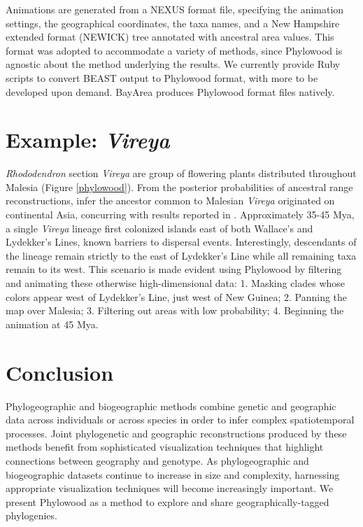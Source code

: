 \documentclass{bioinfo}
\begin{document}
Animations are generated from a NEXUS format file, specifying the animation settings, the geographical coordinates, the taxa names, and a New Hampshire extended format (NEWICK) tree annotated with ancestral area values. This format was adopted to accommodate a variety of methods, since Phylowood is agnostic about the method underlying the results. We currently provide Ruby scripts to convert BEAST output to Phylowood format, with more to be developed upon demand. BayArea produces Phylowood format files natively.

\section{Example: {\it Vireya}}

{\it Rhododendron} section {\it Vireya} are group of flowering plants distributed throughout Malesia (Figure \ref{phylowood}). From the posterior probabilities of ancestral range reconstructions, \cite{landis13} infer the ancestor common to Malesian {\it Vireya} originated on continental Asia, concurring with results reported in \cite{webb12}. Approximately 35-45 Mya, a single {\it Vireya} lineage first colonized islands east of both Wallace's and Lydekker's Lines, known barriers to dispersal events. Interestingly, descendants of the lineage remain strictly to the east of Lydekker's Line while all remaining taxa remain to its west. This scenario is made evident using Phylowood by filtering and animating these otherwise high-dimensional data: 1. Masking clades whose colors appear west of Lydekker's Line, just west of New Guinea; 2. Panning the map over Malesia; 3. Filtering out areas with low probability; 4. Beginning the animation at 45 Mya.

\section{Conclusion}

Phylogeographic and biogeographic methods combine genetic and geographic data across individuals or across species in order to infer complex spatiotemporal processes. Joint phylogenetic and geographic reconstructions produced by these methods benefit from sophisticated visualization techniques that highlight connections between geography and genotype. As phylogeographic and biogeographic datasets continue to increase in size and complexity, harnessing appropriate visualization techniques will become increasingly important. We present Phylowood as a method to explore and share geographically-tagged phylogenies. 
\end{document}
